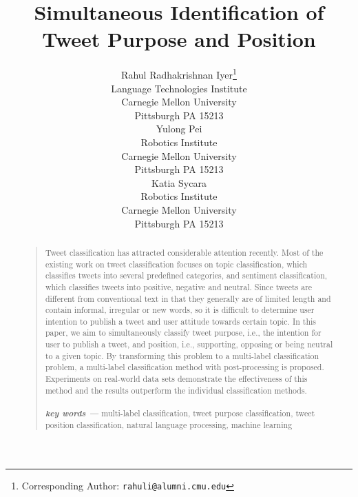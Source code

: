 \documentclass[letterpaper]{article}
\begin{document}
\title{Simultaneous Identification of Tweet Purpose and Position}
\author{Rahul Radhakrishnan Iyer\thanks{Corresponding Author: \texttt{rahuli@alumni.cmu.edu}}\\
Language Technologies Institute\\
Carnegie Mellon University\\
Pittsburgh PA 15213\\
\And
Yulong Pei\\
Robotics Institute\\
Carnegie Mellon University\\
Pittsburgh PA 15213\\
\And
Katia Sycara\\
Robotics Institute\\
Carnegie Mellon University\\
Pittsburgh PA 15213\\
}



\maketitle
\begin{abstract}
\begin{quote}
Tweet classification has attracted considerable attention recently. Most of the existing work on tweet classification focuses on topic classification, which classifies tweets into several predefined categories, and sentiment classification, which classifies tweets into positive, negative and neutral. Since tweets are different from conventional text in that they generally are of limited length and contain informal, irregular or new words, so it is difficult to determine user intention to publish a tweet and user attitude towards certain topic. In this paper, we aim to simultaneously classify tweet purpose, i.e., the intention for user to publish a tweet, and position, i.e., supporting, opposing or being neutral to a given topic. By transforming this problem to a multi-label classification problem, a multi-label classification method with post-processing is proposed. Experiments on real-world data sets demonstrate the effectiveness of this method and the results outperform the individual classification methods.\\~\\

\-\hspace{0.5cm} \textbf{\textit{key words ---}} multi-label classification, tweet purpose classification, tweet position classification, natural language processing, machine learning
\end{quote}
\end{abstract}
\end{document}
